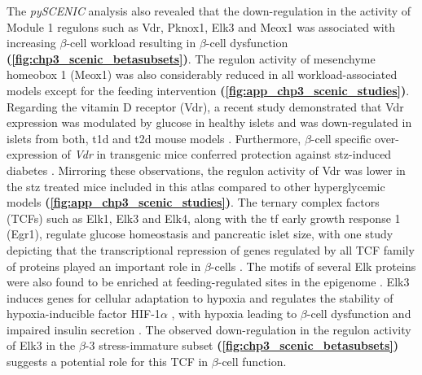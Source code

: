 

\par The \textit{pySCENIC} analysis also revealed that the down-regulation in the activity of Module 1 regulons such as Vdr, Pknox1, Elk3 and Meox1 was associated with increasing $\beta$-cell workload resulting in $\beta$-cell dysfunction \textbf{(\autoref{fig:chp3_scenic_betasubsets})}. The regulon activity of mesenchyme homeobox 1 (Meox1) was also considerably reduced in all workload-associated models except for the feeding intervention \textbf{(\autoref{fig:app_chp3_scenic_studies})}. Regarding the vitamin D receptor (Vdr), a recent study demonstrated that Vdr expression was modulated by glucose in healthy islets and was down-regulated in islets from both, \gls{t1d} and \gls{t2d} mouse models \textbf{\cite{morro_vitamin_2020}}. Furthermore, $\beta$-cell specific over-expression of \textit{Vdr} in transgenic mice conferred protection against \gls{stz}-induced diabetes \textbf{\cite{morro_vitamin_2020}}. Mirroring these observations, the regulon activity of Vdr was lower in the \gls{stz} treated mice included in this atlas compared to other hyperglycemic models \textbf{(\autoref{fig:app_chp3_scenic_studies})}. The ternary complex factors (TCFs) such as Elk1, Elk3 and Elk4, along with the \gls{tf} early growth response 1 (Egr1), regulate glucose homeostasis and pancreatic islet size, with one study depicting that the transcriptional repression of genes regulated by all TCF family of proteins played an important role in $\beta$-cells \textbf{\cite{lesch_ternary_2020}}. The motifs of several Elk proteins were also found to be enriched at feeding-regulated sites in the epigenome \textbf{\cite{wortham_nutrient_2023}}. Elk3 induces genes for cellular adaptation to hypoxia and regulates the stability of hypoxia-inducible factor HIF-1$\alpha$ \textbf{\cite{gross_ternary_2007,gross_ternary_2008}}, with hypoxia leading to $\beta$-cell dysfunction and impaired insulin secretion \textbf{\cite{tsuyama_hypoxia_2023}}. The observed down-regulation in the regulon activity of Elk3 in the $\beta$-3 stress-immature subset \textbf{(\autoref{fig:chp3_scenic_betasubsets})} suggests a potential role for this TCF in $\beta$-cell function.\\





